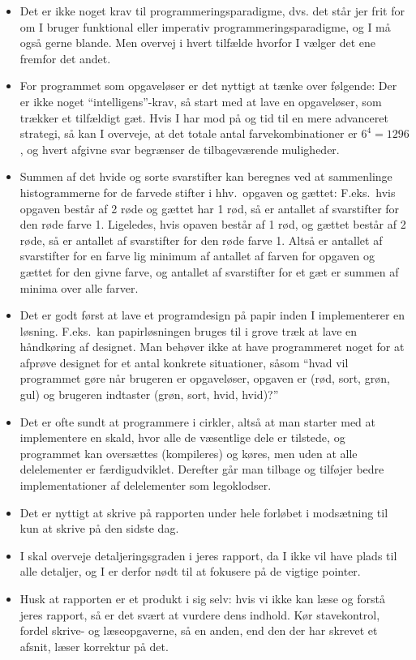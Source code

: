 \documentclass[a4paper,12pt]{article}
\begin{document}
\begin{enumerate}[label=8g.\arabic*,start=0]
\begin{itemize}
  \item Det er ikke noget krav til programmeringsparadigme, dvs. det står jer frit for om I bruger funktional eller imperativ programmeringsparadigme, og I må også gerne blande. Men overvej i hvert tilfælde hvorfor I vælger det ene fremfor det andet.
  \item For programmet som opgaveløser er det nyttigt at tænke over følgende: Der er ikke noget ``intelligens''-krav, så start med at lave en opgaveløser, som trækker et tilfældigt gæt. Hvis I har mod på og tid til en mere advanceret strategi, så kan I overveje, at det totale antal farvekombinationer er $6^4=1296$, og hvert afgivne svar begrænser de tilbageværende muligheder.
  \item Summen af det hvide og sorte svarstifter kan beregnes ved at sammenlinge histogrammerne for de farvede stifter i hhv.\ opgaven og gættet: F.eks.\ hvis opgaven består af 2 røde og gættet har 1 rød, så er antallet af svarstifter for den røde farve 1. Ligeledes, hvis opaven består af 1 rød, og gættet består af 2 røde, så er antallet af svarstifter for den røde farve 1. Altså er antallet af svarstifter for en farve lig minimum af antallet af farven for opgaven og gættet for den givne farve, og antallet af svarstifter for et gæt er summen af minima over alle farver. 
  \item Det er godt først at lave et programdesign på papir inden I implementerer en løsning. F.eks.\ kan papirløsningen bruges til i grove træk at lave en håndkøring af designet. Man behøver ikke at have programmeret noget for at afprøve designet for et antal konkrete situationer, såsom ``hvad vil programmet gøre når brugeren er opgaveløser, opgaven er (rød, sort, grøn, gul) og brugeren indtaster (grøn, sort, hvid, hvid)?''
  \item Det er ofte sundt at programmere i cirkler, altså at man starter med at implementere en skald, hvor alle de væsentlige dele er tilstede, og programmet kan oversættes (kompileres) og køres, men uden at alle delelementer er færdigudviklet. Derefter går man tilbage og tilføjer bedre implementationer af delelementer som legoklodser.
  \item Det er nyttigt at skrive på rapporten under hele forløbet i modsætning til kun at skrive på den sidste dag.
  \item I skal overveje detaljeringsgraden i jeres rapport, da I ikke vil have plads til alle detaljer, og I er derfor nødt til at fokusere på de vigtige pointer.
  \item Husk at rapporten er et produkt i sig selv: hvis vi ikke kan læse og forstå jeres rapport, så er det svært at vurdere dens indhold. Kør stavekontrol, fordel skrive- og læseopgaverne, så en anden, end den der har skrevet et afsnit, læser korrektur på det.

\end{itemize}
\end{enumerate}
\end{document}
